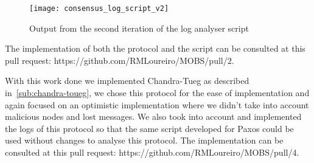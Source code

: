 \begin{figure}[h]
	\centering
	\texttt{[image: consensus\_log\_script\_v2]}
	\caption{Output from the second iteration of the log analyser script}
	\label{fig:consensus_log_script_v2}
\end{figure}

The implementation of both the protocol and
the script can be consulted at this pull request: https://github.com/RMLoureiro/MOBS/pull/2.

With this work done we implemented Chandra-Tueg as described in~\ref{sub:chandra-toueg}, 
we chose this protocol for the ease of implementation
and again focused on an optimistic implementation where we didn't take into account malicious nodes and
lost messages. We also took into account and implemented the logs of this protocol so that the same script
developed for Paxos could be used without changes to analyse this protocol. The implementation can be
consulted at this pull request: https://github.com/RMLoureiro/MOBS/pull/4.